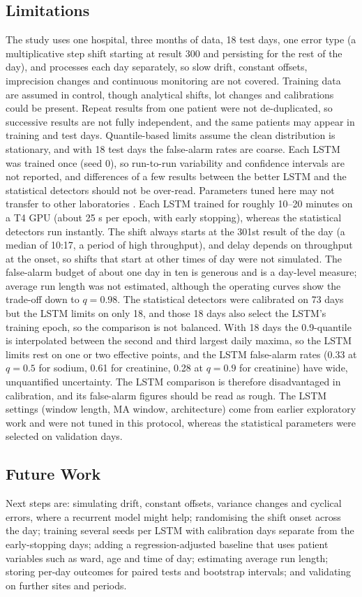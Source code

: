 \documentclass[conference]{IEEEtran}
\begin{document}
\subsection{Limitations}
The study uses one hospital, three months of data, 18 test days, one error type (a multiplicative step shift starting at result 300 and persisting for the rest of the day), and processes each day separately, so slow drift, constant offsets, imprecision changes and continuous monitoring are not covered. Training data are assumed in control, though analytical shifts, lot changes and calibrations could be present. Repeat results from one patient were not de-duplicated, so successive results are not fully independent, and the same patients may appear in training and test days. Quantile-based limits assume the clean distribution is stationary, and with 18 test days the false-alarm rates are coarse. Each LSTM was trained once (seed 0), so run-to-run variability and confidence intervals are not reported, and differences of a few results between the better LSTM and the statistical detectors should not be over-read. Parameters tuned here may not transfer to other laboratories \cite{Bietenbeck2020}. Each LSTM trained for roughly 10--20 minutes on a T4 GPU (about 25 s per epoch, with early stopping), whereas the statistical detectors run instantly. The shift always starts at the 301st result of the day (a median of 10:17, a period of high throughput), and delay depends on throughput at the onset, so shifts that start at other times of day were not simulated. The false-alarm budget of about one day in ten is generous and is a day-level measure; average run length was not estimated, although the operating curves show the trade-off down to $q=0.98$. The statistical detectors were calibrated on 73 days but the LSTM limits on only 18, and those 18 days also select the LSTM's training epoch, so the comparison is not balanced. With 18 days the 0.9-quantile is interpolated between the second and third largest daily maxima, so the LSTM limits rest on one or two effective points, and the LSTM false-alarm rates (0.33 at $q=0.5$ for sodium, 0.61 for creatinine, 0.28 at $q=0.9$ for creatinine) have wide, unquantified uncertainty. The LSTM comparison is therefore disadvantaged in calibration, and its false-alarm figures should be read as rough. The LSTM settings (window length, MA window, architecture) come from earlier exploratory work and were not tuned in this protocol, whereas the statistical parameters were selected on validation days.

\subsection{Future Work}
Next steps are: simulating drift, constant offsets, variance changes and cyclical errors, where a recurrent model might help; randomising the shift onset across the day; training several seeds per LSTM with calibration days separate from the early-stopping days; adding a regression-adjusted baseline that uses patient variables such as ward, age and time of day; estimating average run length; storing per-day outcomes for paired tests and bootstrap intervals; and validating on further sites and periods.
\end{document}

